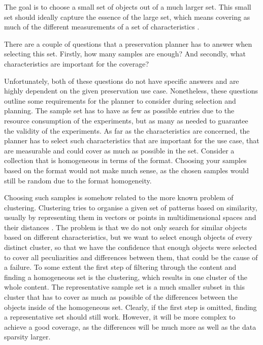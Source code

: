 The goal is to choose a small set of objects out of a much larger set.
This small set should ideally capture the essence of the large set, which means covering as much of the different measurements of a set of characteristics \cite{Becker:2011:PDT:1998076.1998089}.

There are a couple of questions that a preservation planner has to answer when selecting this set.
Firstly, how many samples are enough?
And secondly, what characteristics are important for the coverage?

Unfortunately, both of these questions do not have specific answers and are highly dependent on the given preservation use case.
Nonetheless, these questions outline some requirements for the planner to consider during selection and planning.
The sample set has to have as few as possible entries due to the resource consumption of the experiments, but as many as needed to guarantee the validity of the experiments.
As far as the characteristics are concerned, the planner has to select such characteristics that are important for the use case, that are measurable and could cover as much as possible in the set.
Consider a collection that is homogeneous in terms of the format.
Choosing your samples based on the format would not make much sense, as the chosen samples would still be random due to the format homogeneity.

Choosing such samples is somehow related to the more known problem of clustering.
Clustering tries to organise a given set of patterns based on similarity, usually by representing them in vectors or points in multidimensional spaces and their distances \cite{Jain:1999:DCR:331499.331504}.
The problem is that we do not only search for similar objects based on different characteristics, but we want to select enough objects of every distinct cluster, so that we have the confidence that enough objects were selected to cover all peculiarities and differences between them, that could be the cause of a failure.
To some extent the first step of filtering through the content and finding a homogeneous set is the clustering, which results   in one cluster of the whole content. The representative sample set is a much smaller subset in this cluster that has to cover as much as possible of the differences between the objects inside of the homogeneous set. Clearly, if the first step is omitted, finding a representative set should still work. However, it will be more complex to achieve a good coverage, as the differences will be much more as well as the data sparsity larger. 
